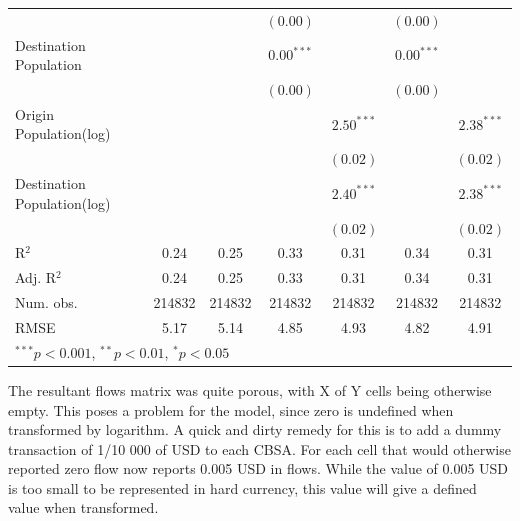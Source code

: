 \begin{table}
\begin{center}
\begin{tabular}{l c c c c c c }
			&               &               & $(0.00)$      &                & $(0.00)$      &                \\
			Destination Population      &               &               & $0.00^{***}$  &                & $0.00^{***}$  &                \\
			&               &               & $(0.00)$      &                & $(0.00)$      &                \\
			Origin Population(log)      &               &               &               & $2.50^{***}$   &               & $2.38^{***}$   \\
			&               &               &               & $(0.02)$       &               & $(0.02)$       \\
			Destination Population(log) &               &               &               & $2.40^{***}$   &               & $2.38^{***}$   \\
			&               &               &               & $(0.02)$       &               & $(0.02)$       \\
			\hline
			R$^2$                        & 0.24          & 0.25          & 0.33          & 0.31           & 0.34          & 0.31           \\
			Adj. R$^2$                   & 0.24          & 0.25          & 0.33          & 0.31           & 0.34          & 0.31           \\
			Num. obs.                    & 214832        & 214832        & 214832        & 214832         & 214832        & 214832         \\
			RMSE                         & 5.17          & 5.14          & 4.85          & 4.93           & 4.82          & 4.91           \\
			\hline
			\multicolumn{7}{l}{\scriptsize{$^{***}p<0.001$, $^{**}p<0.01$, $^*p<0.05$}}
		\end{tabular}
		
		\label{table:coefficients_gravity_2013Q2}
	\end{center}
\end{table}

The resultant flows matrix was quite porous, with X of Y cells being otherwise empty.  This poses a problem for the model, since zero is undefined when transformed by logarithm.  A quick and dirty remedy for this is to add a dummy transaction of 1/10 000 of USD to each CBSA.  For each cell that would otherwise reported zero flow now reports 0.005 USD in flows.  While the value of 0.005 USD is too small to be represented in hard currency, this value will give a defined value when transformed.  

